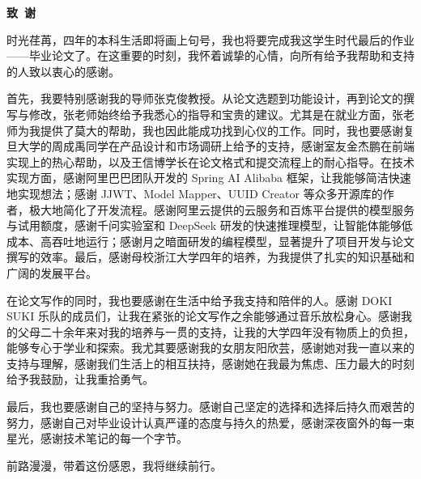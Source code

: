 \cleardoublepage{}
\begin{center}
    \bfseries {} 致~谢
\end{center}

\par 时光荏苒，四年的本科生活即将画上句号，我也将要完成我这学生时代最后的作业——毕业论文了。在这重要的时刻，我怀着诚挚的心情，向所有给予我帮助和支持的人致以衷心的感谢。

\par 首先，我要特别感谢我的导师张克俊教授。从论文选题到功能设计，再到论文的撰写与修改，张老师始终给予我悉心的指导和宝贵的建议。尤其是在就业方面，张老师为我提供了莫大的帮助，我也因此能成功找到心仪的工作。同时，我也要感谢复旦大学的周成禹同学在产品设计和市场调研上给予的支持，感谢室友金杰鹏在前端实现上的热心帮助，以及王信博学长在论文格式和提交流程上的耐心指导。在技术实现方面，感谢阿里巴巴团队开发的 Spring AI Alibaba 框架，让我能够简洁快速地实现想法；感谢 JJWT、Model Mapper、UUID Creator 等众多开源库的作者，极大地简化了开发流程。感谢阿里云提供的云服务和百炼平台提供的模型服务与试用额度，感谢千问实验室和 DeepSeek 研发的快速推理模型，让智能体能够低成本、高吞吐地运行；感谢月之暗面研发的编程模型，显著提升了项目开发与论文撰写的效率。最后，感谢母校浙江大学四年的培养，为我提供了扎实的知识基础和广阔的发展平台。

\par 在论文写作的同时，我也要感谢在生活中给予我支持和陪伴的人。感谢 DOKI SUKI 乐队的成员们，让我在紧张的论文写作之余能够通过音乐放松身心。感谢我的父母二十余年来对我的培养与一贯的支持，让我的大学四年没有物质上的负担，能够专心于学业和探索。我尤其要感谢我的女朋友阳欣芸，感谢她对我一直以来的支持与理解，感谢我们生活上的相互扶持，感谢她在我最为焦虑、压力最大的时刻给予我鼓励，让我重拾勇气。

\par 最后，我也要感谢自己的坚持与努力。感谢自己坚定的选择和选择后持久而艰苦的努力，感谢自己对毕业设计认真严谨的态度与持久的热爱，感谢深夜窗外的每一束星光，感谢技术笔记的每一个字节。

\par 前路漫漫，带着这份感恩，我将继续前行。
